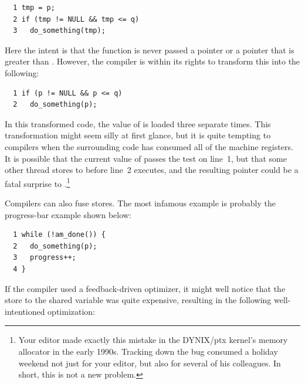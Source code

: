 \vspace{5pt}
\begin{minipage}[t]{\columnwidth}
\scriptsize
\begin{verbatim}
  1 tmp = p;
  2 if (tmp != NULL && tmp <= q)
  3   do_something(tmp);
\end{verbatim}
\end{minipage}
\vspace{5pt}

Here the intent is that the  function is never
passed a  pointer or a pointer that is greater than .
However, the compiler is within its rights to transform this into the
following:

\vspace{5pt}
\begin{minipage}[t]{\columnwidth}
\scriptsize
\begin{verbatim}
  1 if (p != NULL && p <= q)
  2   do_something(p);
\end{verbatim}
\end{minipage}
\vspace{5pt}

In this transformed code, the value of  is loaded three
separate times.
This transformation might seem silly at first glance, but it is quite
tempting to compilers when the surrounding code has consumed all of the
machine registers.
It is possible that the current value of  passes the test on
line~1, but that some other thread stores  to  before
line~2 executes, and the resulting  pointer could be a fatal
surprise to .\footnote{
	Your editor made exactly this mistake in the DYNIX/ptx
	kernel's memory allocator in the early 1990s.
	Tracking down the bug consumed a holiday weekend not just
	for your editor, but also for several of his colleagues.
	In short, this is not a new problem.}

Compilers can also fuse stores.
The most infamous example is probably the progress-bar example
shown below:

\vspace{5pt}
\begin{minipage}[t]{\columnwidth}
\scriptsize
\begin{verbatim}
  1 while (!am_done()) {
  2   do_something(p);
  3   progress++;
  4 }
\end{verbatim}
\end{minipage}
\vspace{5pt}

If the compiler used a feedback-driven optimizer, it might well
notice that the store to the shared variable  was
quite expensive, resulting in the following well-intentioned
optimization:

